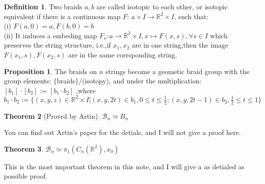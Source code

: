 \documentclass[UTF8]{ctexart}
\newtheorem{theorem}{Theorem}[section]
\theoremstyle{definition}
\newtheorem{definition}{Definition}[section]
\newtheorem{Proposition}[theorem]{Proposition}
\theoremstyle{remark}
\begin{document}
\begin{definition}
	Two braids $a,b$ are called isotopic to each other, or isotopic equivalent if there is a continuous map $F$: $a\times I\rightarrow \mathbb{R}^2\times I$, such that: \\(i) $F(a,0)=a,F(b,0)=b$\\(ii) It induces a embeding map $F_s:a\rightarrow \mathbb{R}^2\times I, x\mapsto F(x,s),\forall s\in I$ which preserves the string structure, i.e.,if $x_1,x_2$ are in one string,then the image $F(x_1,s),F(x_2,s)$ are in the same corrsponding string. 
\end{definition}
\begin{Proposition}
	The braids on $n$ strings become a geometic braid group with the group elements:
	$\{$braids$\}$/(isotopy), and under the multiplication:
	$[b_1]\cdot[b_2]:=[b_1\cdot b_2]$ ,where\\ $b_1\cdot b_2:=\{(x,y,z)\in \mathbb{R}^2\times I|(x,y,2t)\in b_1, 0\leq t\leq \frac{1}{2}; (x,y,2t-1)\in b_2, \frac{1}{2}\leq t\leq 1\}$
\end{Proposition}
\begin{theorem}[Provrd by Artin]
	$\mathcal{B}_n\simeq B_n$
\end{theorem}
You can find out Artin's paper for the detials, and I will not  give a proof here.
\begin{theorem}
	$\mathcal{B}_n\simeq \pi_1(C_n(\mathbb{R}^2),x_0)$
\end{theorem}
This is the most important theorem in this note, and I will give a as detialed as possible proof.
\end{document}

